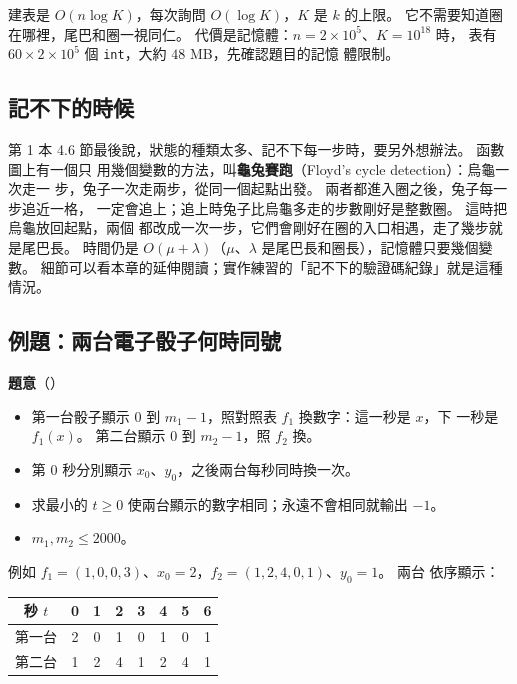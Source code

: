 建表是 $O(n \log K)$，每次詢問 $O(\log K)$，$K$ 是 $k$ 的上限。 它不需要知道圈
在哪裡，尾巴和圈一視同仁。 代價是記憶體：$n = 2 \times 10^5$、$K = 10^{18}$ 時，
表有 $60 \times 2 \times 10^5$ 個 \texttt{int}，大約 $48$ MB，先確認題目的記憶
體限制。

\subsection{記不下的時候}

第 1 本 4.6 節最後說，狀態的種類太多、記不下每一步時，要另外想辦法。 函數圖上有一個只
用幾個變數的方法，叫\textbf{龜兔賽跑}（Floyd's cycle detection）：烏龜一次走一
步，兔子一次走兩步，從同一個起點出發。 兩者都進入圈之後，兔子每一步追近一格，
一定會追上；追上時兔子比烏龜多走的步數剛好是整數圈。 這時把烏龜放回起點，兩個
都改成一次一步，它們會剛好在圈的入口相遇，走了幾步就是尾巴長。 時間仍是
$O(\mu + \lambda)$（$\mu$、$\lambda$ 是尾巴長和圈長），記憶體只要幾個變數。
細節可以看本章的延伸閱讀；實作練習的「記不下的驗證碼紀錄」就是這種情況。

\subsection{例題：兩台電子骰子何時同號}
\label{sec:ex-dice}

\textbf{題意}（）

\begin{itemize}
\item 第一台骰子顯示 $0$ 到 $m_1 - 1$，照對照表 $f_1$ 換數字：這一秒是 $x$，下
一秒是 $f_1(x)$。 第二台顯示 $0$ 到 $m_2 - 1$，照 $f_2$ 換。
\item 第 $0$ 秒分別顯示 $x_0$、$y_0$，之後兩台每秒同時換一次。
\item 求最小的 $t \ge 0$ 使兩台顯示的數字相同；永遠不會相同就輸出 $-1$。
\item $m_1, m_2 \le 2000$。
\end{itemize}

例如 $f_1 = (1, 0, 0, 3)$、$x_0 = 2$，$f_2 = (1, 2, 4, 0, 1)$、$y_0 = 1$。 兩台
依序顯示：

\begin{center}
\begin{tabular}{c|ccccccc}
\toprule
秒 $t$ & 0 & 1 & 2 & 3 & 4 & 5 & 6 \\
\midrule
第一台 & 2 & 0 & 1 & 0 & 1 & 0 & 1 \\
第二台 & 1 & 2 & 4 & 1 & 2 & 4 & 1 \\
\bottomrule
\end{tabular}
\end{center}

